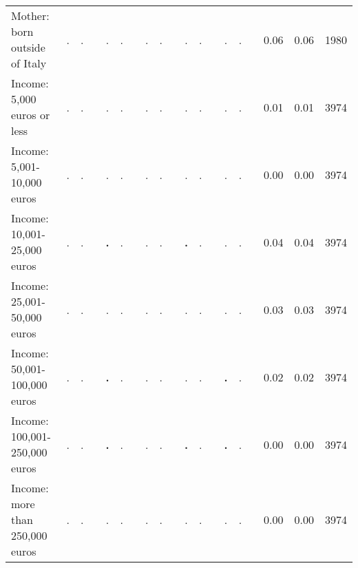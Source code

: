 \begin{tabular}{l c c c c c c c c c c c c c c c c c c}
Mother: born outside of Italy &         . &         . & &         . &         . & &         . &         . & &         . &         . & &         . &         . & &      0.06 &      0.06 &      1980 \\
Income: 5,000 euros or less &         . &         . & &         . &         . & &         . &         . & &         . &         . & &         . &         . & &      0.01 &      0.01 &      3974 \\
Income: 5,001-10,000 euros &         . &         . & &         . &         . & &         . &         . & &         . &         . & &         . &         . & &      0.00 &      0.00 &      3974 \\
Income: 10,001-25,000 euros &         . &         . & & \textbf{        .} &         . & &         . &         . & & \textbf{        .} &         . & &         . &         . & &      0.04 &      0.04 &      3974 \\
Income: 25,001-50,000 euros &         . &         . & &         . &         . & &         . &         . & &         . &         . & &         . &         . & &      0.03 &      0.03 &      3974 \\
Income: 50,001-100,000 euros &         . &         . & & \textbf{        .} &         . & &         . &         . & &         . &         . & & \textbf{        .} &         . & &      0.02 &      0.02 &      3974 \\
Income: 100,001-250,000 euros &         . &         . & & \textbf{        .} &         . & &         . &         . & & \textbf{        .} &         . & & \textbf{        .} &         . & &      0.00 &      0.00 &      3974 \\
Income: more than 250,000 euros &         . &         . & &         . &         . & &         . &         . & &         . &         . & &         . &         . & &      0.00 &      0.00 &      3974 \\
\bottomrule
\end{tabular}
